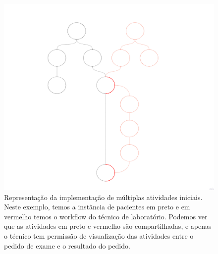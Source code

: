 \begin{figure}
    \centering
    \includegraphics[width=1\textwidth]{imgs/Implementacoes/segundaImplementacao.png}
    \caption{Representação da implementação de múltiplas atividades iniciais. Neste exemplo, temos a instância de pacientes em preto e em vermelho temos o workflow do técnico de laboratório. Podemos ver que as atividades em preto e vermelho são compartilhadas, e apenas o técnico tem permissão de visualização das atividades entre o pedido de exame e o resultado do pedido.}
    \label{fig:segunda_implementacao}
\end{figure}

